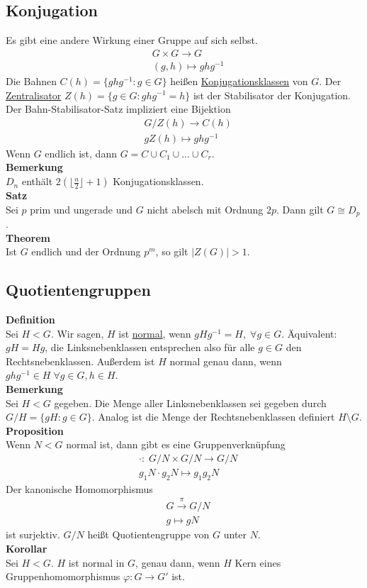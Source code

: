 \documentclass[a4paper, 12pt]{article}
\begin{document}
\subsection{Konjugation}
Es gibt eine andere Wirkung einer Gruppe auf sich selbst. \begin{eqnarray*}
	&G\times G \to G\\
	&(g,h) \mapsto ghg^{-1}
\end{eqnarray*}
Die Bahnen $C(h) = \{ghg^{-1}: g \in G\}$ heißen \underline{Konjugationsklassen} von $G$. Der \underline{Zentralisator} $Z(h) = \{g \in G: ghg^{-1} = h\}$ ist der Stabilisator der Konjugation. Der Bahn-Stabilisator-Satz impliziert eine Bijektion \begin{eqnarray*}
	&G/Z(h) \to C(h)\\
	&gZ(h) \mapsto ghg^{-1}
\end{eqnarray*}
Wenn $G$ endlich ist, dann $G = C\cup C_1 \cup ... \cup C_r$.\\
\textbf{Bemerkung}\\
$D_n$ enthält $2(\lfloor\frac{n}{2}\rfloor +1)$ Konjugationsklassen.\\
\textbf{Satz}\\
Sei $p$ prim und ungerade und $G$ nicht abelsch mit Ordnung $2p$. Dann gilt $G\cong D_{p}$.\\
\textbf{Theorem}\\
Ist $G$ endlich und der Ordnung $p^m$, so gilt $\left|Z(G)\right|>1$.
\subsection{Quotientengruppen}
\textbf{Definition}\\
Sei $H<G$. Wir sagen, $H$ ist \underline{normal}, wenn $gHg^{-1} = H, \; \forall g \in G$. Äquivalent: $gH = Hg$, die Linksnebenklassen entsprechen also für alle $g \in G$ den Rechtsnebenklassen. Außerdem ist $H$ normal genau dann, wenn $ghg^{-1} \in H \; \forall g\in G, h \in H$.\\
\textbf{Bemerkung}\\
Sei $H<G$ gegeben. Die Menge aller Linksnebenklassen sei gegeben durch $G/H = \{gH: g \in G\}$. Analog ist die Menge der Rechtsnebenklassen definiert $H\setminus G$.\\
\textbf{Proposition}\\
Wenn $N<G$ normal ist, dann gibt es eine Gruppenverknüpfung \begin{eqnarray*}
	& \cdot:\; G/N \times G/N \to G/N\\
	& g_1N \cdot g_2N \mapsto g_1g_2N
\end{eqnarray*}
Der kanonische Homomorphismus \begin{eqnarray*}
	& G \overset{\pi}{\to} G/N\\
	& g \mapsto gN
\end{eqnarray*}
ist surjektiv. $G/N$ heißt Quotientengruppe von $G$ unter $N$.\\
\textbf{Korollar}\\
Sei $H<G$. $H$ ist normal in $G$, genau dann, wenn $H$ Kern eines Gruppenhomomorphismus $\varphi: G \to G'$ ist.
\end{document}
